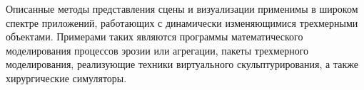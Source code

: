 \documentclass[a4paper,14pt]{extreport}
\begin{document}
Описанные методы представления сцены и визуализации применимы в широком спектре приложений, работающих с динамически изменяющимися трехмерными объектами. Примерами таких являются программы математического моделирования процессов эрозии или агрегации, пакеты трехмерного моделирования, реализующие техники виртуального скульптурирования, а также хирургические симуляторы.


\appendix
\renewcommand{\appendixname}{Приложение}



\end{document}

